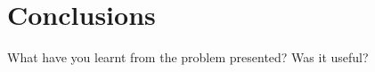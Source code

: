 \documentclass[a4paper, 11pt]{article}
\begin{document}
\section{Conclusions}



What have you learnt from the problem presented?
Was it useful?
\end{document}

